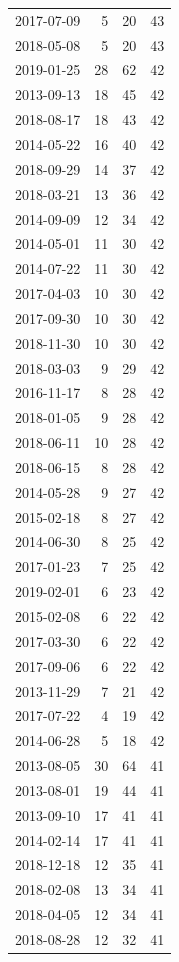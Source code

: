 \begin{tabular}{lrrr}
2017-07-09 & 5 & 20 & 43 \\
2018-05-08 & 5 & 20 & 43 \\
2019-01-25 & 28 & 62 & 42 \\
2013-09-13 & 18 & 45 & 42 \\
2018-08-17 & 18 & 43 & 42 \\
2014-05-22 & 16 & 40 & 42 \\
2018-09-29 & 14 & 37 & 42 \\
2018-03-21 & 13 & 36 & 42 \\
2014-09-09 & 12 & 34 & 42 \\
2014-05-01 & 11 & 30 & 42 \\
2014-07-22 & 11 & 30 & 42 \\
2017-04-03 & 10 & 30 & 42 \\
2017-09-30 & 10 & 30 & 42 \\
2018-11-30 & 10 & 30 & 42 \\
2018-03-03 & 9 & 29 & 42 \\
2016-11-17 & 8 & 28 & 42 \\
2018-01-05 & 9 & 28 & 42 \\
2018-06-11 & 10 & 28 & 42 \\
2018-06-15 & 8 & 28 & 42 \\
2014-05-28 & 9 & 27 & 42 \\
2015-02-18 & 8 & 27 & 42 \\
2014-06-30 & 8 & 25 & 42 \\
2017-01-23 & 7 & 25 & 42 \\
2019-02-01 & 6 & 23 & 42 \\
2015-02-08 & 6 & 22 & 42 \\
2017-03-30 & 6 & 22 & 42 \\
2017-09-06 & 6 & 22 & 42 \\
2013-11-29 & 7 & 21 & 42 \\
2017-07-22 & 4 & 19 & 42 \\
2014-06-28 & 5 & 18 & 42 \\
2013-08-05 & 30 & 64 & 41 \\
2013-08-01 & 19 & 44 & 41 \\
2013-09-10 & 17 & 41 & 41 \\
2014-02-14 & 17 & 41 & 41 \\
2018-12-18 & 12 & 35 & 41 \\
2018-02-08 & 13 & 34 & 41 \\
2018-04-05 & 12 & 34 & 41 \\
2018-08-28 & 12 & 32 & 41 \\

\end{tabular}
